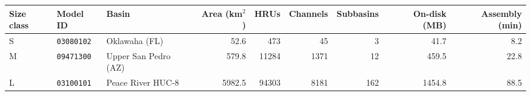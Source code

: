 \begin{tabular}{@{}lllrrrrrr@{}}
\toprule
Size class & Model ID & Basin & Area (km$^2$) & HRUs & Channels & Subbasins & On-disk (MB) & Assembly (min) \\
\midrule
S & \texttt{03080102} & Oklawaha (FL) & 52.6 & 473 & 45 & 3 & 41.7 & 8.2 \\
M & \texttt{09471300} & Upper San Pedro (AZ) & 579.8 & 11284 & 1371 & 12 & 459.5 & 22.8 \\
L & \texttt{03100101} & Peace River HUC-8 & 5982.5 & 94303 & 8181 & 162 & 1454.8 & 88.5 \\
\bottomrule
\end{tabular}
